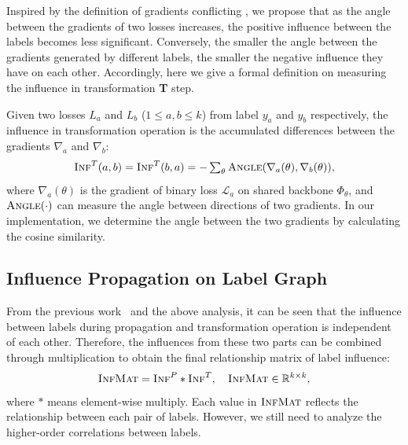 Inspired by the definition of gradients conflicting \citep{yu2020gradient}, we propose that as the angle between the gradients of two losses increases, the positive influence between the labels becomes less significant. Conversely, the smaller the angle between the gradients generated by different labels, the smaller the negative influence they have on each other.
Accordingly, here we give a formal definition on measuring the influence in transformation \textbf{T} step.
\begin{definition}\label{def:backinf}
Given two losses $L_a$ and $L_b$ ($1 \leq a, b \leq k$) from label $y_a$ and $y_b$ respectively, the influence in transformation operation is the accumulated differences between the gradients $\nabla_a$ and $\nabla_b$:
\begin{equation}
  \textstyle  \textsc{Inf}^{T}(a,b) = \textsc{Inf}^{T}(b,a) = - \sum_{\theta} \textsc{Angle} ( \nabla_a(\theta),\nabla_b(\theta) ),
\end{equation}
where $\nabla_a(\theta)$ is the gradient of binary loss $\mathcal{L}_a$ on shared backbone $\Phi_{\theta}$, and $\textsc{Angle}(\cdot)$ can measure the angle between directions of two gradients. In our implementation, we determine the angle between the two gradients by calculating the cosine similarity.
\end{definition}


\subsection{Influence Propagation on Label Graph} \label{sec:InfProp}
 From the previous work~\citep{zhang2022model,wu2019simplifying,zhang2022graph} and the above analysis, it can be seen that the influence between labels during propagation and transformation operation is independent of each other. Therefore, the influences from these two parts can be combined through multiplication to obtain the final relationship matrix of label influence:
\begin{equation}
    \textsc{InfMat} = \textsc{Inf}^{P} * \textsc{Inf}^{T}, \quad \textsc{InfMat} \in \mathbb{R}^{k \times k},
\end{equation}
where $*$ means element-wise multiply.
Each value in $\textsc{InfMat}$ reflects the relationship between each pair of labels. 
However, we still need to analyze the higher-order correlations between labels. 

